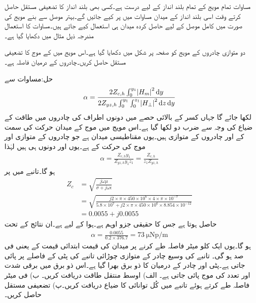 مساوات  تمام مویج کے تمام بلند انداز کے لیے درست ہے۔کسی بھی بلند انداز کا تضعیفی مستقل حاصل کرتے وقت اسی بلند انداز کے میدان مساوات  میں پر کیے جائیں گے۔بہتر موصل سے بنے مویج کی صورت میں کامل موصل کے لیے حاصل کردہ میدان ہی استعمال کیے جاتے ہیں۔مساوات  کا استعمال مندرجہ ذیل مثال میں دکھایا گیا ہے۔

دو متوازی چادروں کے مویج کو صفحہ  پر شکل  میں دکھایا گیا ہے۔اس مویج میں  کے  موج کا تضعیفی مستقل حاصل کریں۔چادروں کے درمیان فاصلہ  ہے۔

حل:مساوات   سے
\begin{align*}
\alpha=\frac{2 Z_{c,h} \int_0^{y_1} \abs{H_m}^2 \dif y}{2 Z_{yz,h} \int_0^{y_1} \int_0^{z_1} \abs{H_{\perp}}^2 \dif z \dif y}
\end{align*}
لکھا جائے گا جہاں کسر کے بالائی حصے میں دونوں اطراف کی چادروں میں طاقت کے ضیاع کی وجہ سے ضرب دو لکھا گیا ہے۔اس مویج میں  موج کے میدان حرکت کی سمت کے  اور چادروں کے متوازی ہیں۔یوں مقناطیسی میدان  ہے جو چادروں کے متوازی اور موج کی حرکت کے  ہے۔یوں  اور  دونوں   ہی ہیں لہٰذا
 \begin{align*}
\alpha=\frac{Z_{c,h} y_1}{Z_{yz,h} y_1 z_1}=\frac{Z_{c,h}}{z_1 Z_{yz,h}}
\end{align*}
ہو گا۔تانبے میں  پر
\begin{align*}
Z_{c}&=\sqrt{\frac{j\omega \mu}{\sigma+j\omega \epsilon}}\\
&=\sqrt{\frac{j 2 \times \pi \times 450 \times 10^{6} \times 4 \times \pi \times 10^{-7}}{5.8\times 10^{7}+j 2\times \pi \times 450 \times 10^{6} \times 8.854 \times 10^{-12}}}\\
&=0.0055+j0.0055
\end{align*}
حاصل ہوتا ہے جس کا حقیقی جزو  اوہم ہے۔ہوا کے لیے  ہے۔ان نتائج کے تحت
 \begin{align*}
\alpha=\frac{0.0055}{0.2 \times  376.7}=\SI{73}{\micro\neper/\meter} 
\end{align*}
ہو گا۔یوں ایک کلو میٹر فاصلہ طے کرنے پر میدان کی قیمت ابتدائی قیمت کے  یعنی  فی صد ہو گی۔
تانبے کی وسیع چادر کے متوازی  چوڑائی تانبے کی پٹی  کے فاصلے پر پائی جاتی ہے۔پٹی اور چادر کے درمیان  کا ذو برق بھرا گیا ہے۔اس ذو برق میں  برقی شدت اور  تعدد کی  موج پائی جاتی ہے۔ الف) اوسط منتقل طاقت دریافت کریں۔ ب) فی میٹر فاصلہ طے کرتے ہوئے تانبے میں کُل توانائی کا ضیاع دریافت کریں۔پ) تضعیفی مستقل حاصل کریں۔

